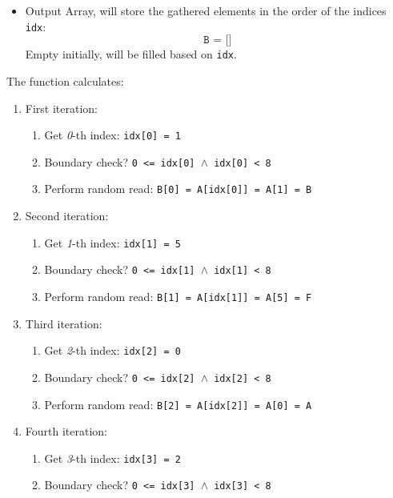 \begin{examplebox}
\begin{itemize}
        \item Output Array, will store the gathered elements in the order of the indices \texttt{idx}:
        \begin{equation*}
            \texttt{B = []}
        \end{equation*}
        Empty initially, will be filled based on \texttt{idx}.
    \end{itemize}
    The function calculates:
    \begin{enumerate}
        \item First iteration:
        \begin{enumerate}
            \item Get \emph{0}-th index: \texttt{idx[0] = 1}
            \item Boundary check? \texttt{0 <= idx[0] $\land$ idx[0] < 8} \textcolor{Green3}{}
            \item Perform random read: \texttt{B[0] = A[idx[0]] = A[1] = B}
        \end{enumerate}
        \item Second iteration:
        \begin{enumerate}
            \item Get \emph{1}-th index: \texttt{idx[1] = 5}
            \item Boundary check? \texttt{0 <= idx[1] $\land$ idx[1] < 8} \textcolor{Green3}{}
            \item Perform random read: \texttt{B[1] = A[idx[1]] = A[5] = F}
        \end{enumerate}
        \newpage
        \item Third iteration:
        \begin{enumerate}
            \item Get \emph{2}-th index: \texttt{idx[2] = 0}
            \item Boundary check? \texttt{0 <= idx[2] $\land$ idx[2] < 8} \textcolor{Green3}{}
            \item Perform random read: \texttt{B[2] = A[idx[2]] = A[0] = A}
        \end{enumerate}
        \item Fourth iteration:
        \begin{enumerate}
            \item Get \emph{3}-th index: \texttt{idx[3] = 2}
            \item Boundary check? \texttt{0 <= idx[3] $\land$ idx[3] < 8} \textcolor{Green3}{}

\end{enumerate}
\end{enumerate}
\end{examplebox}
